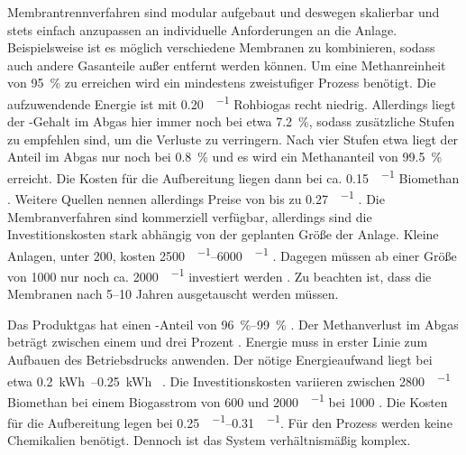 Membrantrennverfahren sind modular aufgebaut und deswegen skalierbar und stets einfach anzupassen an individuelle Anforderungen an die Anlage. Beispielsweise ist es möglich verschiedene Membranen zu kombinieren, sodass auch andere Gasanteile außer  entfernt werden können. Um eine Methanreinheit von \SI{95}{\percent} zu erreichen wird ein mindestens zweistufiger Prozess benötigt. Die aufzuwendende Energie ist mit \SI{0,20}{\kwh\per\normvol} Rohbiogas recht niedrig. Allerdings liegt der -Gehalt im Abgas hier immer noch bei etwa \SI{7,2}{\percent}, sodass zusätzliche Stufen zu empfehlen sind, um die Verluste zu verringern. Nach vier Stufen etwa liegt der Anteil im Abgas nur noch bei \SI{0,8}{\percent} und es wird ein Methananteil von \SI{99,5}{\percent} erreicht. Die Kosten für die Aufbereitung liegen dann bei ca. \SI{0,15}{\sieuro\per\normvol} Biomethan \parencite{Miltner2016}. Weitere Quellen nennen allerdings Preise von bis zu \SI{0,27}{\sieuro\per\normvol} \parencite{Emp18}. Die Membranverfahren sind kommerziell verfügbar, allerdings sind die Investitionskosten stark abhängig von der geplanten Größe der Anlage. Kleine Anlagen, unter \SI{200}{\normvolh}, kosten \SIrange{2500}{6000}{\sieuro\per\normvolh} \parencite{BHPT13}. Dagegen müssen ab einer Größe von \SI{1000}{\normvolh} nur noch ca. \SI{2000}{\sieuro\per\normvolh} investiert werden \parencite{BHPT13}. Zu beachten ist, dass die Membranen nach \SIrange{5}{10}{\relax} Jahren ausgetauscht werden müssen. \parencite{Miltner2016} \parencite{KGKK2019} \newline

Das Produktgas hat einen -Anteil von \SIrange{96}{99}{\percent} \parencite{DSW13} \parencite{KGKK2019}.
Der Methanverlust im Abgas beträgt zwischen einem und drei Prozent \parencite{KGKK2019} \parencite{dena2019}. 
Energie muss in erster Linie zum Aufbauen des Betriebsdrucks anwenden. Der nötige Energieaufwand liegt bei etwa \SIrange{0,2}{0,25}{\kWh\normvol} \parencite{Coll17}.
Die Investitionskosten variieren zwischen \SI{2800}{\sieuro\per\normvolh} Biomethan bei einem Biogasstrom von \SI{600}{\normvolh} und \SI{2000}{\sieuro\per\normvolh} bei \SI{1000}{\normvolh} \parencite{BHPT13}.
Die Kosten für die Aufbereitung legen bei \SIrange{0,25}{0,31}{\sieuro\per\normvol}.
Für den Prozess werden keine Chemikalien benötigt. Dennoch ist das System verhältnismäßig komplex.\parencite{AONC2019}


